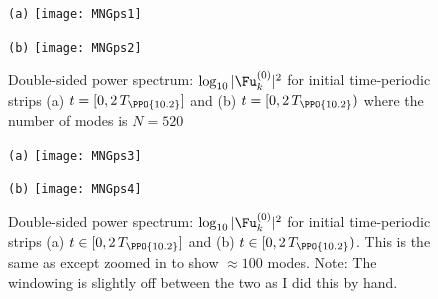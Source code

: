 \begin{description}
\begin{figure}[ht]
  \begin{minipage}[height=.45\textheight]{.45\textwidth}
    \centering \small{\texttt{(a)}}
    \texttt{[image: MNGps1]}
  \end{minipage}
  \begin{minipage}[height=.45\textheight]{.45\textwidth}
    \centering \small{\texttt{(b)}}
    \texttt{[image: MNGps2]}
  \end{minipage}
   \caption{Double-sided power spectrum: $\log_{10}|\Fu^{(0)}_{k}|^2$ for initial time-periodic strips
   (a) $t = [0, 2\,T_{\PPO{10.2}}]$
   and (b) $t = [0, 2\,T_{\PPO{10.2}})$ where the number of modes is $N=520$}
  \label{fig:MNGFinit520}
\end{figure}

\begin{figure}[h]
  \begin{minipage}[height=.45\textheight]{.45\textwidth}
    \centering \small{\texttt{(a)}}
    \texttt{[image: MNGps3]}
  \end{minipage}
  \begin{minipage}[height=.45\textheight]{.45\textwidth}
    \centering \small{\texttt{(b)}}
    \texttt{[image: MNGps4]}
  \end{minipage}
   \caption{
   Double-sided power spectrum: $\log_{10}|\Fu^{(0)}_{k}|^2$ for initial time-periodic strips (a) $t \in [0, 2\,T_{\PPO{10.2}}]$
   and (b) $t \in [0, 2\,T_{\PPO{10.2}})$. This is the same as  except zoomed in to show $\approx 100$ modes. \color{red} Note: The windowing
   is slightly off between the two as I did this by hand.
            }
  \label{fig:MNGFinit100}
\end{figure}


\end{description}
